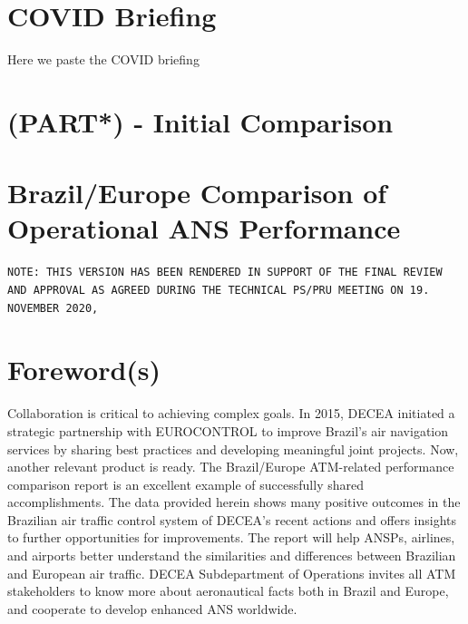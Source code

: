 \documentclass[
]{book}
\begin{document}
\hypertarget{covid-briefing}{%
\chapter*{COVID Briefing}\label{covid-briefing}}

Here we paste the COVID briefing

\hypertarget{part---initial-comparison}{%
\chapter{(PART*) - Initial Comparison}\label{part---initial-comparison}}

\hypertarget{brazileurope-comparison-of-operational-ans-performance}{%
\chapter{Brazil/Europe Comparison of Operational ANS Performance}\label{brazileurope-comparison-of-operational-ans-performance}}

\begin{verbatim}
NOTE: THIS VERSION HAS BEEN RENDERED IN SUPPORT OF THE FINAL REVIEW AND APPROVAL AS AGREED DURING THE TECHNICAL PS/PRU MEETING ON 19. NOVEMBER 2020, 
\end{verbatim}

\hypertarget{forewords}{%
\chapter*{Foreword(s)}\label{forewords}}

Collaboration is critical to achieving complex goals.
In 2015, DECEA initiated a strategic partnership with EUROCONTROL to improve Brazil's air navigation services by sharing best practices and developing meaningful joint projects.
Now, another relevant product is ready. The Brazil/Europe ATM-related performance comparison report is an excellent example of successfully shared accomplishments.
The data provided herein shows many positive outcomes in the Brazilian air traffic control system of DECEA's recent actions and offers insights to further opportunities for improvements.
The report will help ANSPs, airlines, and airports better understand the similarities and differences between Brazilian and European air traffic. DECEA Subdepartment of Operations invites all ATM stakeholders to know more about aeronautical facts both in Brazil and Europe, and cooperate to develop enhanced ANS worldwide.
\end{document}
